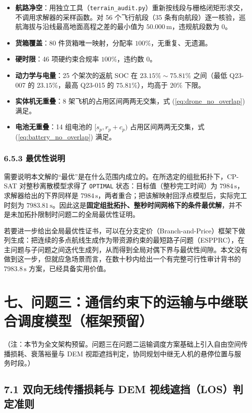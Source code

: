 \documentclass[withoutpreface,bwprint]{format}
\begin{document}
\begin{itemize}[leftmargin=*]
    \item \textbf{航路净空}：用独立工具（\texttt{terrain\_audit.py}）重新按线段与栅格闭矩形求交，不调用求解器的采样函数。对 56 个飞行航段（35 条有向航段）逐一核验，巡航海拔与沿线最高地面高程之差的最小值为 $50.000\,\text{m}$，违规航段数为 0。
    \item \textbf{货箱覆盖}：80 件货箱唯一映射，分配率 $100\%$，无重复、无遗漏。
    \item \textbf{硬时限}：46 项硬约束合规率 $100\%$，违约数 0。
    \item \textbf{动力学与电量}：25 个架次的返航 SOC 在 $23.15\%\sim75.81\%$ 之间（最低 Q23-007 的 $23.15\%$，最高 Q23-015 的 $75.81\%$），均高于 $20\%$ 下限。
    \item \textbf{实体机无重叠}：8 架飞机的占用区间两两无交集，式 (\ref{eq:drone_no_overlap}) 满足。
    \item \textbf{电池无重叠}：14 组电池的 $[s_p, r_p + c_p)$ 占用区间两两无交集，式 (\ref{eq:battery_no_overlap}) 满足。
\end{itemize}

\subsubsection{6.5.3 最优性说明}
需要说明本文解的“最优”是在什么范围内成立的。在所选定的组批拓扑下，CP-SAT 对整秒离散模型求得了 \texttt{OPTIMAL} 状态：目标值（整秒完工时间）为 $7984\,\text{s}$，求解器给出的下界同样是 $7984\,\text{s}$，两者重合；把该解映射回浮点模型后，实际完工时刻为 $7983.81\,\text{s}$。因此这是\textbf{固定组批拓扑、整秒时间网格下的条件最优解}，并不是未加拓扑限制时问题二的全局最优性证明。

若要进一步给出全局最优性证书，可以在分支定价（Branch-and-Price）框架下做列生成：把连续的多点航线生成作为带资源约束的最短路子问题（ESPPRC），在主问题与子问题之间迭代生成列，从而得到全局对偶下界与最优性间隙。本文没有做到这一步，但就应急场景而言，在数十秒内给出一个有完整可行性审计背书的 $7983.8\,\text{s}$ 方案，已经具备实用价值。


\section{七、问题三：通信约束下的运输与中继联合调度模型（框架预留）}
{\kaishu （注：本节为全文架构预留。问题三在问题二运输调度方案基础上引入自由空间传播损耗、衰落裕量与 DEM 视距遮挡判定，协同规划中继无人机的悬停位置与服务时段。）}

\subsection{7.1 双向无线传播损耗与 DEM 视线遮挡（LOS）判定准则}
\end{document}
